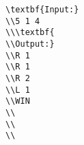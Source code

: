 \begin{verbatim}
\textbf{Input:}
\\5 1 4
\\\textbf{
\\Output:}
\\R 1
\\R 1
\\R 2
\\L 1
\\WIN
\\
\\
\\\end{verbatim}